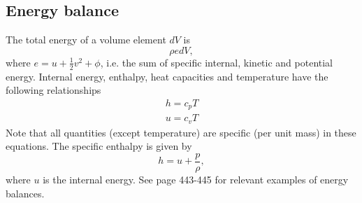 \subsection{Energy balance}
The total energy of a volume element $dV$ is
\begin{equation}
    \rho e dV,
\end{equation}
where $e = u + \frac{1}{2}v^2 + \phi$, i.e. the sum of specific internal, kinetic and potential energy.
Internal energy, enthalpy, heat capacities and temperature have the following relationships
\begin{align}
    h = c_p T\\
    u = c_v T
\end{align}
Note that all quantities (except temperature) are specific (per unit mass) in these equations. The specific enthalpy is given by
\begin{equation}
    h = u + \frac{p}{\rho},
\end{equation}
where $u$ is the internal energy. See page 443-445 for relevant examples of energy balances.